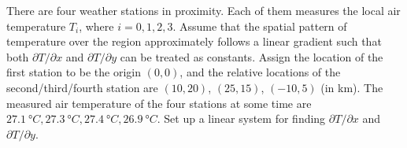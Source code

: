\begin{exmp}
\label{exmp:weatherstats}
There are four weather stations in proximity. Each of them measures the local air temperature $T_i$, where $i = 0,1,2,3$. Assume that the spatial pattern of temperature over the region approximately follows a linear gradient such that both $\partial T/\partial x$ and $\partial T/\partial y$ can be treated as constants. Assign the location of the first station to be the origin $(0,0)$, and the relative locations of the second/third/fourth station are $(10,20)$, $(25,15)$, $(-10,5)$ (in \si{\km}). The measured air temperature of the four stations at some time are $\SI{27.1}{\degree C}, \SI{27.3}{\degree C}, \SI{27.4}{\degree C}, \SI{26.9}{\degree C}$. Set up a linear system for finding $\partial T/\partial x$ and $\partial T/\partial y$.
\end{exmp}
